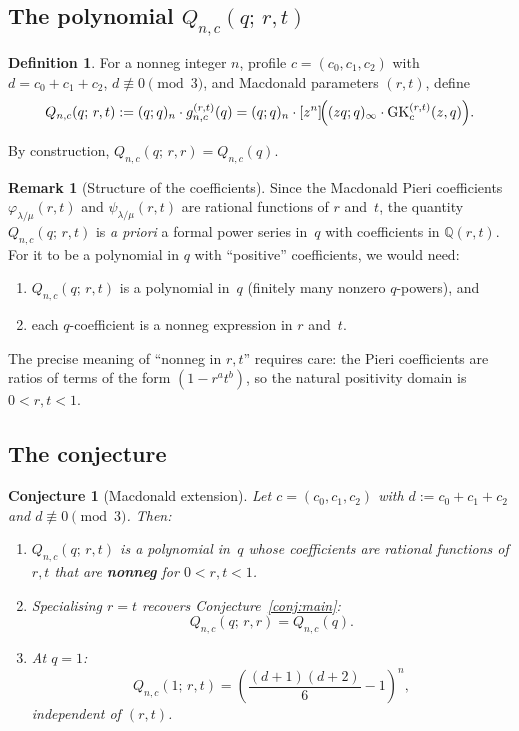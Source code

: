 \documentclass[11pt]{article}
\theoremstyle{plain}
\newtheorem{conjecture}[theorem]{Conjecture}
\theoremstyle{definition}
\newtheorem{definition}[theorem]{Definition}
\newtheorem{remark}[theorem]{Remark}
\newcommand{\Q}{\mathbb{Q}}
\newcommand{\GK}{\operatorname{GK}}
\newcommand{\qpoch}[2]{(#1;#2)_\infty}
\newcommand{\qpochn}[3]{(#1;#2)_{#3}}
\begin{document}
\subsection{The polynomial $Q_{n,c}(q;\,r,t)$}

\begin{definition}
\label{def:Q-rt}
For a nonneg integer $n$, profile $c = (c_0, c_1, c_2)$ with
$d = c_0 + c_1 + c_2$, $d \not\equiv 0 \pmod{3}$, and Macdonald
parameters $(r,t)$, define
\begin{equation}
  Q_{n,c}(q;\,r,t)
  := \qpochn{q}{q}{n} \cdot g_{n,c}^{(r,t)}(q)
  = \qpochn{q}{q}{n} \cdot [z^n]\!\Bigl(
    \qpoch{zq}{q} \cdot \GK_c^{(r,t)}(z,q)
  \Bigr).
  \label{eq:Q-rt}
\end{equation}
\end{definition}

By construction, $Q_{n,c}(q;\,r,r) = Q_{n,c}(q)$.

\begin{remark}[Structure of the coefficients]
Since the Macdonald Pieri coefficients $\varphi_{\lambda/\mu}(r,t)$ and
$\psi_{\lambda/\mu}(r,t)$ are rational functions of $r$ and~$t$,
the quantity $Q_{n,c}(q;\,r,t)$ is \emph{a priori} a formal power series
in~$q$ with coefficients in $\Q(r,t)$.  For it to be a polynomial in $q$
with ``positive'' coefficients, we would need:
\begin{enumerate}
  \item[(a)] $Q_{n,c}(q;\,r,t)$ is a polynomial in~$q$
    (finitely many nonzero $q$-powers), and
  \item[(b)] each $q$-coefficient is a nonneg expression in $r$ and~$t$.
\end{enumerate}
The precise meaning of ``nonneg in $r,t$'' requires care: the Pieri
coefficients are ratios of terms of the form $(1 - r^a t^b)$, so the
natural positivity domain is $0 < r, t < 1$.
\end{remark}

\subsection{The conjecture}

\begin{conjecture}[Macdonald extension]
\label{conj:mac}
Let $c = (c_0, c_1, c_2)$ with $d := c_0 + c_1 + c_2$ and
$d \not\equiv 0 \pmod{3}$.  Then:
\begin{enumerate}
  \item[(i)] $Q_{n,c}(q;\,r,t)$ is a polynomial in~$q$ whose
    coefficients are rational functions of $r,t$ that are
    \textbf{nonneg} for $0 < r, t < 1$.
  \item[(ii)] Specialising $r = t$ recovers Conjecture~\ref{conj:main}:
    \[
      Q_{n,c}(q;\,r,r) = Q_{n,c}(q).
    \]
  \item[(iii)] At $q = 1$:
    \[
      Q_{n,c}(1;\,r,t) = \left(\frac{(d+1)(d+2)}{6} - 1\right)^{\!n},
    \]
    independent of $(r,t)$.
\end{enumerate}
\end{conjecture}
\end{document}
